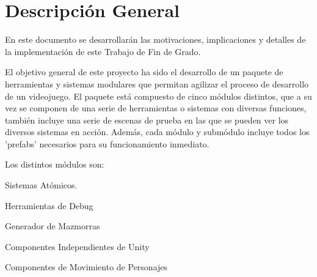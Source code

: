\section{Descripción General}
En este documento se desarrollarán las motivaciones, implicaciones y detalles de la implementación de este Trabajo de Fin de Grado.

El objetivo general de este proyecto ha sido el desarrollo de un paquete de herramientas y sistemas modulares que permitan agilizar el proceso de desarrollo de un videojuego. 
El paquete está compuesto de cinco módulos distintos, que a su vez se componen de una serie de herramientas o sistemas con diversas funciones, también incluye una serie de 
escenas de prueba en las que se pueden ver los diversos sistemas en acción. Además, cada módulo y submódulo incluye todos los 'prefabs' necesarios para su funcionamiento 
inmediato. 

Los distintos módulos son: 
\begin{compactitem}
  \item Sistemas Atómicos.   
  \item Herramientas de Debug
  \item Generador de Mazmorras
  \item Componentes Independientes de Unity
  \item Componentes de Movimiento de Personajes
\end{compactitem} 

